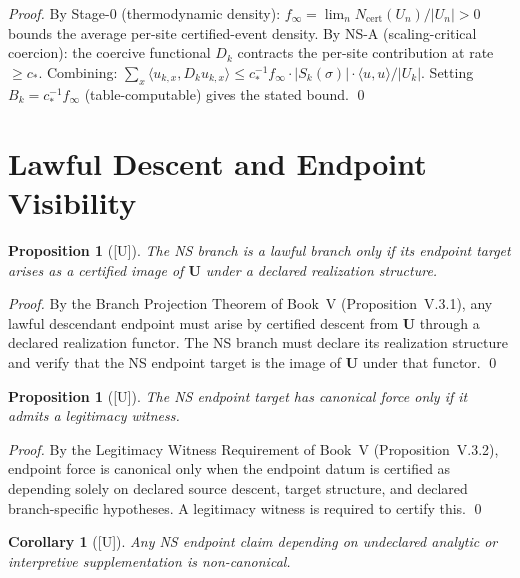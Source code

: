 \documentclass[12pt,oneside]{amsbook}
\theoremstyle{plain}
\newtheorem{proposition}[theorem]{Proposition}
\newtheorem{corollary}[theorem]{Corollary}
\theoremstyle{definition}
\theoremstyle{remark}
\newcommand{\status}[1]{\textup{[#1]}}
\begin{document}
\begin{proof}
By Stage-0 (thermodynamic density): $f_\infty = \lim_n N_{\mathrm{cert}}(U_n)/|U_n| > 0$
bounds the average per-site certified-event density. By NS-A (scaling-critical coercion):
the coercive functional $D_k$ contracts the per-site contribution at rate $\geq c_*$.
Combining: $\sum_x \langle u_{k,x}, D_k u_{k,x}\rangle \leq c_*^{-1} f_\infty
\cdot |S_k(\sigma)| \cdot \langle u, u\rangle / |U_k|$.
Setting $B_k = c_*^{-1} f_\infty$ (table-computable) gives the stated bound. \qed
\end{proof}


\section{Lawful Descent and Endpoint Visibility}

\begin{proposition}[\status{U}]\label{prop:NS-lawful}
The NS branch is a lawful branch only if its endpoint target
arises as a certified image of $\mathbf{U}$ under a declared
realization structure.
\end{proposition}

\begin{proof}
By the Branch Projection Theorem of Book~V
(Proposition~V.3.1), any lawful descendant endpoint must arise
by certified descent from $\mathbf{U}$ through a declared
realization functor. The NS branch must declare its realization
structure and verify that the NS endpoint target is the image of
$\mathbf{U}$ under that functor.
\qed
\end{proof}

\begin{proposition}[\status{U}]\label{prop:NS-witness}
The NS endpoint target has canonical force only if it admits a
legitimacy witness.
\end{proposition}

\begin{proof}
By the Legitimacy Witness Requirement of Book~V
(Proposition~V.3.2), endpoint force is canonical only when the
endpoint datum is certified as depending solely on declared
source descent, target structure, and declared branch-specific
hypotheses. A legitimacy witness is required to certify this.
\qed
\end{proof}

\begin{corollary}[\status{U}]\label{cor:NS-no-undeclared}
Any NS endpoint claim depending on undeclared analytic or
interpretive supplementation is non-canonical.
\end{corollary}
\end{document}
